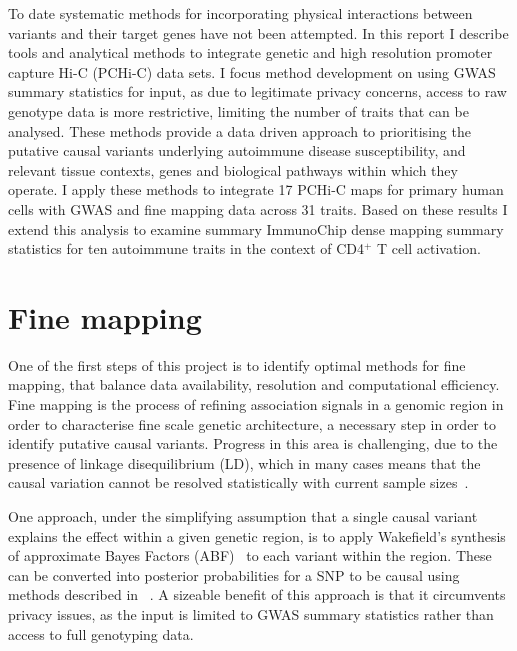 \documentclass[a4paper,11pt]{report}
\begin{document}

To date systematic methods for incorporating physical interactions between variants and their target genes have not been attempted. In this report I describe tools and analytical methods to integrate genetic and high resolution promoter capture Hi-C (PCHi-C) data sets. I focus method development on using GWAS summary statistics for input, as due to legitimate privacy concerns, access to raw genotype data is more restrictive, limiting the number of traits that can be analysed. These methods provide a data driven approach to prioritising the putative causal variants underlying autoimmune disease susceptibility, and  relevant tissue contexts, genes and biological pathways within which they operate. I apply these methods to integrate 17 PCHi-C maps for primary human cells with GWAS and fine mapping data across 31 traits. Based on these results I extend this analysis to examine summary ImmunoChip dense mapping summary statistics for ten autoimmune traits in the context of CD4${^+}$ T cell activation.

\section{Fine mapping}
\label{sect:finemapping}
One of the first steps of this project is to identify optimal methods for fine mapping, that balance data availability, resolution and computational efficiency. Fine mapping is the process of refining association signals in a genomic region in order to characterise fine scale genetic architecture, a necessary step in order to identify putative causal variants. Progress in this area is challenging, due to the presence of linkage disequilibrium (LD), which in many cases means that the causal variation cannot be resolved statistically with current sample sizes~\citep{LiKellis2016}. 

 One approach, under the simplifying assumption that a single causal variant explains the effect within a given genetic region, is to apply Wakefield's synthesis of approximate Bayes Factors (ABF)~\citep{Wakefield2009} to each variant within the region. These can be converted into posterior probabilities for a SNP to be causal using methods described in ~\citet{The_Wellcome_Trust_Case_Control_Consortium2012-ad}. A sizeable benefit of this approach is that it circumvents privacy issues, as the input is limited to GWAS summary statistics rather than access to full genotyping data.
\end{document}

